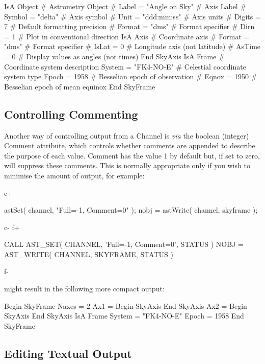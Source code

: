 \documentclass[twoside,11pt]{starlink}
\begin{document}
{\begin{terminalv}
       IsA Object 	# Astrometry Object
#         Label = "Angle on Sky" 	# Axis Label
#         Symbol = "delta" 	# Axis symbol
#         Unit = "ddd:mm:ss" 	# Axis units
#         Digits = 7 	# Default formatting precision
#         Format = "dms" 	# Format specifier
#         Dirn = 1 	# Plot in conventional direction
       IsA Axis 	# Coordinate axis
#         Format = "dms" 	# Format specifier
#         IsLat = 0 	# Longitude axis (not latitude)
#         AsTime = 0 	# Display values as angles (not times)
       End SkyAxis
 IsA Frame 	# Coordinate system description
    System = "FK4-NO-E" 	# Celestial coordinate system type
    Epoch = 1958 	# Besselian epoch of observation
#   Eqnox = 1950 	# Besselian epoch of mean equinox
 End SkyFrame
\end{terminalv}
\normalsize

\subsection{\label{ss:channelcommenting}Controlling Commenting}

Another way of controlling output from a Channel is \emph{via} the
boolean (integer) Comment attribute, which controls whether comments
are appended to describe the purpose of each value. Comment has the
value 1 by default but, if set to zero, will suppress these
comments. This is normally appropriate only if you wish to minimise
the amount of output, for example:

c+
\small
\begin{terminalv}
astSet( channel, "Full=-1, Comment=0" );
nobj = astWrite( channel, skyframe );
\end{terminalv}
\normalsize
c-
f+
\small
\begin{terminalv}
      CALL AST_SET( CHANNEL, 'Full=-1, Comment=0', STATUS )
      NOBJ = AST_WRITE( CHANNEL, SKYFRAME, STATUS )
\end{terminalv}
\normalsize
f-

might result in the following more compact output:

\small
\begin{terminalv}
 Begin SkyFrame
    Naxes = 2
    Ax1 =
       Begin SkyAxis
       End SkyAxis
    Ax2 =
       Begin SkyAxis
       End SkyAxis
 IsA Frame
    System = "FK4-NO-E"
    Epoch = 1958
 End SkyFrame
\end{terminalv}
\normalsize

\subsection{Editing Textual Output}

}
\end{document}
